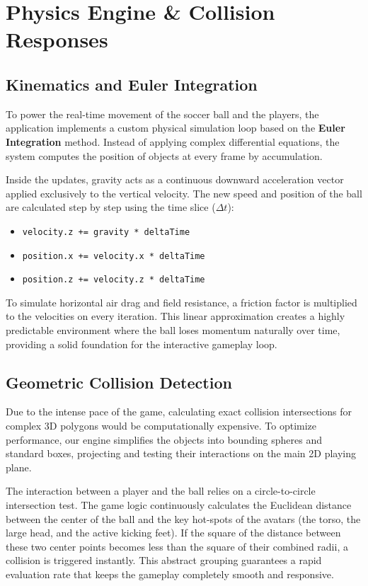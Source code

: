 \chapter{Physics Engine \& Collision Responses}

\section{Kinematics and Euler Integration}
To power the real-time movement of the soccer ball and the players, the application implements a custom physical simulation loop based on the \textbf{Euler Integration} method. Instead of applying complex differential equations, the system computes the position of objects at every frame by accumulation.

Inside the updates, gravity acts as a continuous downward acceleration vector applied exclusively to the vertical velocity. The new speed and position of the ball are calculated step by step using the time slice ($\Delta t$):

\begin{itemize}
    \item \texttt{velocity.z += gravity * deltaTime}
    \item \texttt{position.x += velocity.x * deltaTime}
    \item \texttt{position.z += velocity.z * deltaTime}
\end{itemize}

To simulate horizontal air drag and field resistance, a friction factor is multiplied to the velocities on every iteration. This linear approximation creates a highly predictable environment where the ball loses momentum naturally over time, providing a solid foundation for the interactive gameplay loop.

\section{Geometric Collision Detection}
Due to the intense pace of the game, calculating exact collision intersections for complex 3D polygons would be computationally expensive. To optimize performance, our engine simplifies the objects into bounding spheres and standard boxes, projecting and testing their interactions on the main 2D playing plane.

The interaction between a player and the ball relies on a circle-to-circle intersection test. The game logic continuously calculates the Euclidean distance between the center of the ball and the key hot-spots of the avatars (the torso, the large head, and the active kicking feet). If the square of the distance between these two center points becomes less than the square of their combined radii, a collision is triggered instantly. This abstract grouping guarantees a rapid evaluation rate that keeps the gameplay completely smooth and responsive.

